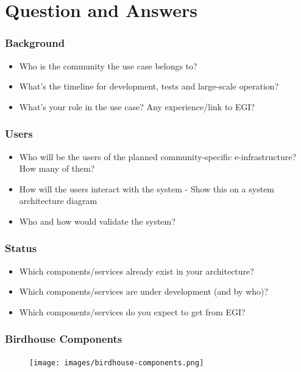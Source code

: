 \documentclass{beamer}
\begin{document}

  \section{Question and Answers}

  \begin{frame}
    \frametitle{Background}
    \begin{itemize}
      \item Who is the community the use case belongs to?
      \item What's the timeline for development, tests and large-scale operation?
      \item What's your role in the use case? Any experience/link to EGI? 
    \end{itemize}
  \end{frame}


   \begin{frame}
    \frametitle{Users}
    \begin{itemize}
      \item Who will be the users of the planned community-specific e-infrastructure? How many of them?
      \item How will the users interact with the system - Show this on a system architecture diagram
      \item Who and how would validate the system? 
    \end{itemize}
  \end{frame}


   \begin{frame}
    \frametitle{Status}
    \begin{itemize}
      \item Which components/services already exist in your architecture?
      \item Which components/services are under development (and by who)?
      \item Which components/services do you expect to get from EGI? 
    \end{itemize}
  \end{frame}


  \begin{frame}
    \frametitle{Birdhouse Components}
    \begin{figure}
      \texttt{[image: images/birdhouse-components.png]}
    \end{figure}
  \end{frame}
\end{document}
